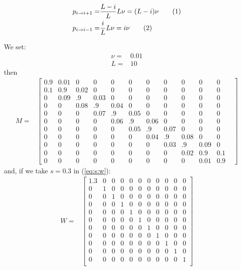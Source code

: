 \documentclass[]{article}
\newcommand\numberthis{\addtocounter{equation}{1}\tag{\theequation}}
\begin{document}
\begin{align*}
	p_{i\rightarrow i+1} =&\frac{L-i}{L}L\nu = (L-i)\nu \numberthis \label{eq:p:plus}\\
	p_{i \rightarrow i-1}=& \frac{i}{L}L\nu = i\nu \numberthis \label{eq:p:minus}
\end{align*}


We set:
\begin{align*}
	\nu=&0.01\\
	L=&10 
\end{align*}
then
\begin{align*}
	M =& \begin{bmatrix}
		0.9 &0.01&   0&   0&   0&   0&   0&   0&   0&   0&   0\\
		0.1 & 0.9&0.02&   0&   0&0    &0   &0   &0   &0   &0\\
		0   &0.09&  .9&0.03& 0&   0&   0&   0&   0&   0&   0\\
		0   &   0&0.08&  .9&0.04& 0&   0&   0&   0&   0&   0\\
		0   &   0&   0&0.07&  .9&0.05& 0&  0&   0&   0&   0\\
		0   &   0&   0&   0&0.06&  .9&0.06& 0&   0&   0&   0\\
		0   &   0&   0&   0&   0&0.05&  .9&0.07& 0&   0&   0\\
		0   &   0&   0&   0&   0&   0&0.04&  .9&0.08& 0&   0\\
		0   &   0&   0&   0&   0&   0&   0&0.03&  .9&0.09& 0\\
		0   &   0&   0&   0&   0&   0&   0&   0&0.02&0.9&0.1\\
		0   &   0&   0&   0&   0&   0&   0&   0&   0& 0.01&0.9& 
	\end{bmatrix}
\end{align*}
and, if we take $s=0.3$ in (\ref{eq:s:w}):
\begin{align*}
	W =& \begin{bmatrix}
	    1.3 &0&   0&   0&   0&   0&   0&   0&   0&   0&   0\\
		0 & 1&0&   0&   0&0    &0   &0   &0   &0   &0\\
		0 & 0&1&   0&   0&0    &0   &0   &0   &0   &0\\
		0 & 0&0&   1&   0&0    &0   &0   &0   &0   &0\\
		0 & 0&0&   0&   1&0    &0   &0   &0   &0   &0\\
		0 & 0&0&   0&   0&1    &0   &0   &0   &0   &0\\
		0 & 0&0&   0&   0&0    &1   &0   &0   &0   &0\\
		0 & 0&0&   0&   0&0    &0   &1   &0   &0   &0\\
		0 & 0&0&   0&   0&0    &0   &0   &1   &0   &0\\
		0 & 0&0&   0&   0&0    &0   &0   &0   &1   &0\\
		0 & 0&0&   0&   0&0    &0   &0   &0   &0   &1\\
	\end{bmatrix}
\end{align*}
\end{document}
